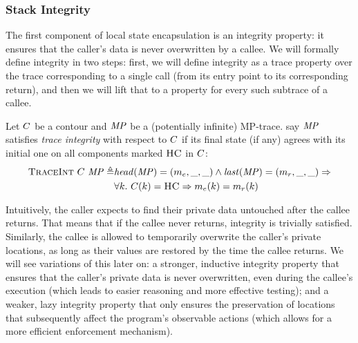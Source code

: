 \documentclass[acmsmall,review,anonymous]{acmart}\settopmatter{printfolios=true,printccs=false,printacmref=false}
\begin{document}
{%


\subsubsection{Stack Integrity}

The first component of local state encapsulation is an integrity
property: it ensures that the caller's data is never overwritten by a
callee. We will formally define integrity in two steps: first, we will
define integrity as a trace property over the trace corresponding to a
single call (from its entry point to its corresponding return), and
then we will lift that to a property for every such subtrace of a
callee.


Let \(C\) be a contour and \(\mathit{MP}\) be a (potentially infinite)
MP-trace. say \(\mathit{MP}\) satisfies {\em trace integrity} with
respect to \(C\) if its final state (if any) agrees with its
initial one on all components marked \(\textsc{HC}\) in \(C\):
%
\[\begin{split}
  \text{\sc TraceInt} ~ C ~ \mathit{MP} \triangleq &
    \mathit{head}(\mathit{MP}) = (m_e,\_,\_) \land
    \mathit{last}(\mathit{MP}) = (m_r,\_,\_) \Rightarrow \\
  & \forall k. ~ C(k) = \textsc{HC} \Rightarrow
    m_e(k) = m_r(k) \\
\end{split}\]

Intuitively, the caller expects to find their private data untouched
after the callee returns. That means that if the callee never returns,
integrity is trivially satisfied. Similarly, the callee is allowed to
temporarily overwrite the caller's private locations,
as long as their values are restored
by the time the callee returns. We will see variations of this later on: a
stronger, inductive integrity property that ensures that the caller's
private data is never overwritten, even during the callee's execution
(which leads to easier reasoning and more effective testing);
and a weaker, lazy integrity property that only ensures the preservation
of locations that subsequently affect the program's observable actions
(which allows for a more efficient enforcement mechanism).

}
\end{document}
